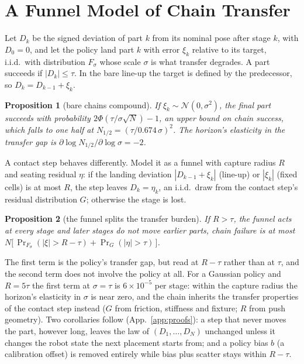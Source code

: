 \documentclass{article}
\newtheorem{proposition}{Proposition}
\begin{document}
\section{A Funnel Model of Chain Transfer}
\label{sec:model}
Let $D_k$ be the signed deviation of part $k$ from its nominal pose after stage $k$, with $D_0=0$, and let the
policy land part $k$ with error $\xi_k$ relative to its target, i.i.d.\ with distribution $F_\sigma$ whose scale
$\sigma$ is what transfer degrades. A part succeeds if $|D_k|\le\tau$. In the bare line-up the target is defined by
the predecessor, so $D_k=D_{k-1}+\xi_k$.
\begin{proposition}[bare chains compound]
\label{prop:bare}
If $\xi_k\sim\mathcal{N}(0,\sigma^2)$, the final part succeeds with probability $2\Phi(\tau/\sigma\sqrt N)-1$, an
upper bound on chain success, which falls to one half at $N_{1/2}=(\tau/0.674\,\sigma)^2$. The horizon's elasticity
in the transfer gap is $\partial\log N_{1/2}/\partial\log\sigma=-2$.
\end{proposition}
A contact step behaves differently. Model it as a funnel with capture radius $R$ and seating residual $\eta$: if the
landing deviation $|D_{k-1}+\xi_k|$ (line-up) or $|\xi_k|$ (fixed cells) is at most $R$, the step leaves
$D_k=\eta_k$, an i.i.d.\ draw from the contact step's residual distribution $G$; otherwise the stage is lost.
\begin{proposition}[the funnel splits the transfer burden]
\label{prop:funnel}
If $R>\tau$, the funnel acts at every stage and later stages do not move earlier parts, chain failure is at most
$N\big[\,\Pr_{F_\sigma}(|\xi|>R-\tau)+\Pr_G(|\eta|>\tau)\,\big]$.
\end{proposition}
The first term is the policy's transfer gap, but read at $R-\tau$ rather than at $\tau$, and the second term does not
involve the policy at all. For a Gaussian policy and $R=5\tau$ the first term at $\sigma=\tau$ is $6\times10^{-5}$ per
stage: within the capture radius the horizon's elasticity in $\sigma$ is near zero, and the chain inherits the
transfer properties of the contact step instead ($G$ from friction, stiffness and fixture; $R$ from push geometry).
Two corollaries follow (App.~\ref{app:proofs}): a step that never moves the part, however long, leaves the law of
$(D_1,\dots,D_N)$ unchanged unless it changes the robot state the next placement starts from; and a policy bias $b$
(a calibration offset) is removed entirely while bias plus scatter stays within $R-\tau$.
\end{document}
